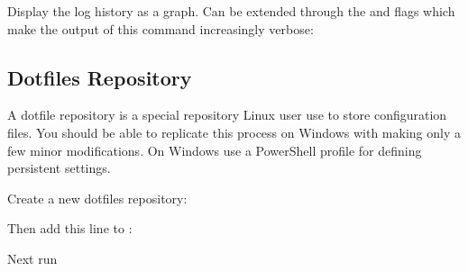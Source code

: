 \begin{flushleft}
	Display the log history as a graph. Can be extended through the 
	and  flags which make the output of this command increasingly verbose:
\end{flushleft}

\begin{flushleft}
	\hbox{}
\end{flushleft}

\subsection{Dotfiles Repository}\label{dotfiles-repository}

\begin{flushleft}
	A dotfile repository is a special repository Linux user use to store configuration
	files. You should be able to replicate this process on Windows with making only a
	few minor modifications. On Windows use a PowerShell profile for defining persistent
	settings.
\end{flushleft}

\begin{flushleft}
	Create a new dotfiles repository:
\end{flushleft}

\begin{flushleft}
\end{flushleft}
\vspace{-0.6cm}
\begin{flushleft}
\end{flushleft}

\begin{flushleft}
	Then add this line to :
\end{flushleft}

\begin{flushleft}
	\hbox{}
\end{flushleft}

\begin{flushleft}
	Next run
\end{flushleft}

\begin{flushleft}
\end{flushleft}


